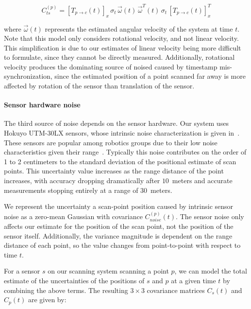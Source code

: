 \documentclass[12pt,onecolumn,oneside]{book}
\begin{document}
\begin{equation}
C^{(p)}_{ts} = \left[ T_{p\rightarrow c}(t) \right]_x \, \sigma_{t} \, \vec{\omega}(t) \, \vec{\omega}^T(t) \, \sigma_{t} \, \left[ T_{p\rightarrow c}(t) \right]_x^T
\end{equation}

where $\vec{\omega}(t)$ represents the estimated angular velocity of the system at time $t$. Note that this model only considers rotational velocity, and not linear velocity.  This simplification is due to our estimates of linear velocity being more difficult to formulate, since they cannot be directly measured.  Additionally, rotational velocity produces the dominating source of noised caused by timestamp mis-synchronization, since the estimated position of a point scanned far away is more affected by rotation of the sensor than translation of the sensor.

\paragraph*{Sensor hardware noise}
The third source of noise depends on the sensor hardware.  Our system uses Hokuyo UTM-30LX sensors, whose intrinsic noise characterization is given in~\cite{Pomerleau12}.  These sensors are popular among robotics groups due to their low noise characteristics given their range~\cite{GTSAM14}.  Typically this noise contributes on the order of 1 to 2 centimeters to the standard deviation of the positional estimate of scan points.  This uncertainty value increases as the range distance of the point increases, with accuracy dropping dramatically after $10$~meters and accurate measurements stopping entirely at a range of $30$~meters.  

We represent the uncertainty a scan-point position caused by intrinsic sensor noise as a zero-mean Gaussian with covariance $C^{(p)}_{noise}(t)$.  The sensor noise only affects our estimate for the position of the scan point, not the position of the sensor itself.  Additionally, the variance magnitude is dependent on the range distance of each point, so the value changes from point-to-point with respect to time $t$.

For a sensor $s$ on our scanning system scanning a point $p$, we can model the total estimate of the uncertainties of the positions of $s$ and $p$ at a given time $t$ by combining the above terms.  The resulting $3 \times 3$ covariance matrices $C_s(t)$ and $C_p(t)$ are given by:
\end{document}
